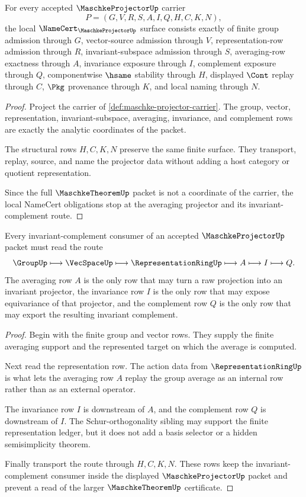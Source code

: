 \begin{theorem}
\label{thm:maschke-projector-namecert-obligations}
For every accepted $\MaschkeProjectorUp$ carrier
$$
P=(G,V,R,S,A,I,Q,H,C,K,N),
$$
the local $\NameCert_{\MaschkeProjectorUp}$ surface consists exactly of finite group admission through $G$, vector-source admission through $V$, representation-row admission through $R$, invariant-subspace admission through $S$, averaging-row exactness through $A$, invariance exposure through $I$, complement exposure through $Q$, componentwise $\hsame$ stability through $H$, displayed $\Cont$ replay through $C$, $\Pkg$ provenance through $K$, and local naming through $N$.
\end{theorem}
\begin{proof}
Project the carrier of \autoref{def:maschke-projector-carrier}. The group, vector, representation, invariant-subspace, averaging, invariance, and complement rows are exactly the analytic coordinates of the packet.

The structural rows $H,C,K,N$ preserve the same finite surface. They transport, replay, source, and name the projector data without adding a host category or quotient representation.

Since the full $\MaschkeTheoremUp$ packet is not a coordinate of the carrier, the local NameCert obligations stop at the averaging projector and its invariant-complement route.
\end{proof}

\begin{theorem}
\label{thm:maschke-projector-invariant-complement-route}
Every invariant-complement consumer of an accepted $\MaschkeProjectorUp$ packet must read the route
$$
\GroupUp \longmapsto \VecSpaceUp \longmapsto \RepresentationRingUp \longmapsto A \longmapsto I \longmapsto Q .
$$
The averaging row $A$ is the only row that may turn a raw projection into an invariant projector, the invariance row $I$ is the only row that may expose equivariance of that projector, and the complement row $Q$ is the only row that may export the resulting invariant complement.
\end{theorem}
\begin{proof}
Begin with the finite group and vector rows. They supply the finite averaging support and the represented target on which the average is computed.

Next read the representation row. The action data from $\RepresentationRingUp$ is what lets the averaging row $A$ replay the group average as an internal row rather than as an external operator.

The invariance row $I$ is downstream of $A$, and the complement row $Q$ is downstream of $I$. The Schur-orthogonality sibling may support the finite representation ledger, but it does not add a basis selector or a hidden semisimplicity theorem.

Finally transport the route through $H,C,K,N$. These rows keep the invariant-complement consumer inside the displayed $\MaschkeProjectorUp$ packet and prevent a read of the larger $\MaschkeTheoremUp$ certificate.
\end{proof}

